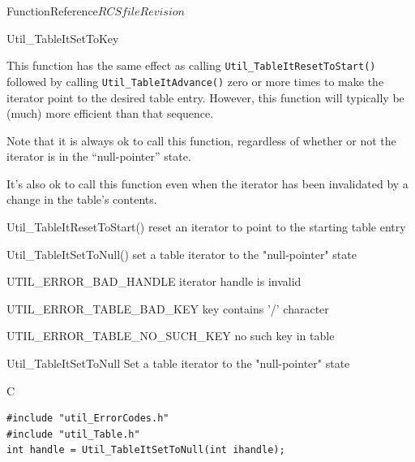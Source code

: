 \begin{cactuspart}{FunctionReference}{$RCSfile$}{$Revision$}
\begin{FunctionDescription}{Util\_TableItSetToKey}
\begin{Discussion}
This function has the same effect as calling \verb|Util_TableItResetToStart()|
followed by calling \verb|Util_TableItAdvance()| zero or more times
to make the iterator point to the desired table entry.  However, this
function will typically be (much) more efficient than that sequence.

Note that it is always ok to call this function, regardless of
whether or not the iterator is in the ``null-pointer'' state.

It's also ok to call this function even when the iterator has been
invalidated by a change in the table's contents.
\end{Discussion}

\begin{SeeAlsoSection}
\begin{SeeAlso}{Util\_TableItResetToStart()}
reset an iterator to point to the starting table entry
\end{SeeAlso}
\begin{SeeAlso}{Util\_TableItSetToNull()}
set a table iterator to the "null-pointer" state
\end{SeeAlso}
\end{SeeAlsoSection}

\begin{ErrorSection}
\begin{Error}{UTIL\_ERROR\_BAD\_HANDLE}
iterator handle is invalid
\end{Error}
\begin{Error}{UTIL\_ERROR\_TABLE\_BAD\_KEY}
key contains '/' character
\end{Error}
\begin{Error}{UTIL\_ERROR\_TABLE\_NO\_SUCH\_KEY}
no such key in table
\end{Error}
\end{ErrorSection}
\end{FunctionDescription}


\begin{FunctionDescription}{Util\_TableItSetToNull}
\label{Util-TableItSetToNull}
Set a table iterator to the "null-pointer" state

\begin{SynopsisSection}
\begin{Synopsis}{C}
\begin{verbatim}
#include "util_ErrorCodes.h"
#include "util_Table.h"
int handle = Util_TableItSetToNull(int ihandle);
\end{verbatim}
\end{Synopsis}
\end{SynopsisSection}


\end{FunctionDescription}
\end{cactuspart}
